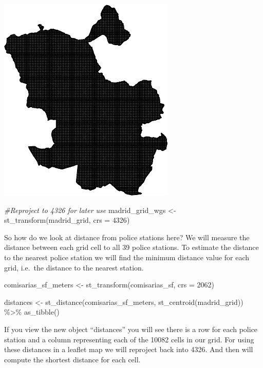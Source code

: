 \documentclass[
]{book}
\newenvironment{Shaded}{\begin{snugshade}}{\end{snugshade}}
\newcommand{\AttributeTok}[1]{\textcolor[rgb]{0.77,0.63,0.00}{#1}}
\newcommand{\CommentTok}[1]{\textcolor[rgb]{0.56,0.35,0.01}{\textit{#1}}}
\newcommand{\DecValTok}[1]{\textcolor[rgb]{0.00,0.00,0.81}{#1}}
\newcommand{\FunctionTok}[1]{\textcolor[rgb]{0.00,0.00,0.00}{#1}}
\newcommand{\NormalTok}[1]{#1}
\newcommand{\OtherTok}[1]{\textcolor[rgb]{0.56,0.35,0.01}{#1}}
\newcommand{\SpecialCharTok}[1]{\textcolor[rgb]{0.00,0.00,0.00}{#1}}
\begin{document}
\includegraphics{crime_mapping_files/figure-latex/unnamed-chunk-69-1.pdf}

\begin{Shaded}
\begin{Highlighting}[]
\CommentTok{\#Reproject to 4326 for later use}
\NormalTok{madrid\_grid\_wgs }\OtherTok{\textless{}{-}} \FunctionTok{st\_transform}\NormalTok{(madrid\_grid, }\AttributeTok{crs =} \DecValTok{4326}\NormalTok{)}
\end{Highlighting}
\end{Shaded}

So how do we look at distance from police stations here? We will measure the distance between each grid cell to all 39 police stations. To estimate the distance to the nearest police station we will find the minimum distance value for each grid, i.e.~the distance to the nearest station.

\begin{Shaded}
\begin{Highlighting}[]
\NormalTok{comisarias\_sf\_meters }\OtherTok{\textless{}{-}} \FunctionTok{st\_transform}\NormalTok{(comisarias\_sf, }\AttributeTok{crs =} \DecValTok{2062}\NormalTok{)}

\NormalTok{distances }\OtherTok{\textless{}{-}} \FunctionTok{st\_distance}\NormalTok{(comisarias\_sf\_meters, }
                         \FunctionTok{st\_centroid}\NormalTok{(madrid\_grid)) }\SpecialCharTok{\%\textgreater{}\%} 
  \FunctionTok{as\_tibble}\NormalTok{()}
\end{Highlighting}
\end{Shaded}

If you view the new object ``distances'' you will see there is a row for each police station and a column representing each of the 10082 cells in our grid. For using these distances in a leaflet map we will reproject back into 4326. And then will compute the shortest distance for each cell.
\end{document}
